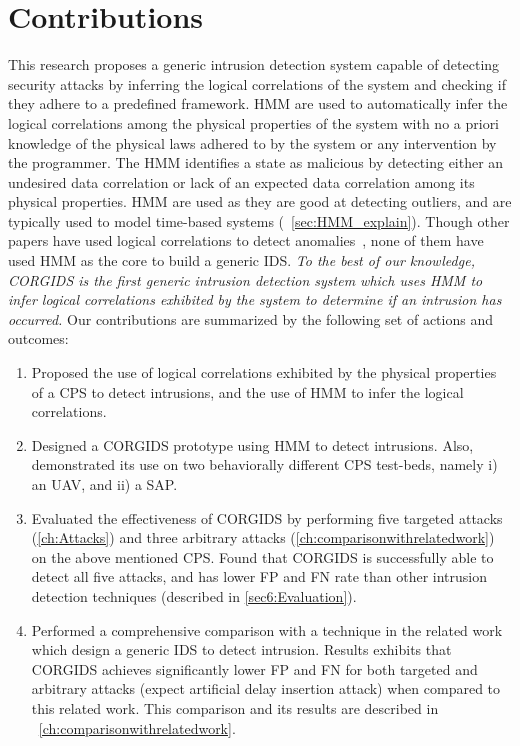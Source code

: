 \section{Contributions}
\label{sec:Contributions}

This research proposes a generic intrusion detection system capable of detecting security attacks by inferring the logical correlations of the system and checking if they adhere to a predefined framework. \ac{HMM}  are used to automatically infer the logical correlations among the physical properties of the system with no a priori knowledge of the physical laws adhered to by the system or any intervention by the programmer. The \ac{HMM} identifies a state as malicious by detecting either an undesired data correlation or lack of an expected data correlation among its physical properties. \ac{HMM} are used as they are good at detecting outliers, and are typically used to model time-based systems (~\autoref{sec:HMM_explain}).  
Though other papers have used logical correlations to detect anomalies~\cite{iturbe2017feasibility,krotofil2015process,chen2018learning,zohrevand2016hidden}, none of them have used \ac{HMM} as the core to build a generic \ac{IDS}. \textit{To the best of our knowledge, \ac{CORGIDS} is the first generic intrusion detection system which uses \ac{HMM} to infer logical correlations exhibited by the system to determine if an intrusion has occurred.} Our contributions are summarized by the following set of actions and outcomes:

\begin{enumerate}

\item Proposed the use of logical correlations exhibited by the physical properties of a \ac{CPS} to detect intrusions, and the use of \acf{HMM} to infer the logical correlations.

\item Designed a \acf{CORGIDS} prototype using \acf{HMM} to detect intrusions. Also, demonstrated its use on two behaviorally different \ac{CPS} test-beds, namely i) an \ac{UAV}, and ii) a \acf{SAP}.

\item Evaluated the effectiveness of \ac{CORGIDS} by performing five targeted attacks (\autoref{ch:Attacks}) and three arbitrary attacks (\autoref{ch:comparisonwithrelatedwork}) on the above mentioned \ac{CPS}. Found that \ac{CORGIDS} is successfully able to detect all five attacks, and has lower \acf{FP} and \acf{FN} rate than other intrusion detection techniques (described in \autoref{sec6:Evaluation}).

\item Performed a comprehensive comparison with a technique in the related work which design a generic IDS to detect intrusion. Results exhibits that \ac{CORGIDS} achieves significantly lower \ac{FP} and \ac{FN} for both targeted and arbitrary attacks (expect artificial delay insertion attack) when compared to this related work. This comparison and its results are described in ~\autoref{ch:comparisonwithrelatedwork}.


\end{enumerate}

